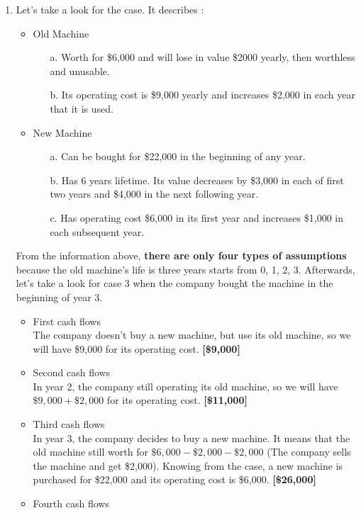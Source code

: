 \documentclass{article}
\begin{document}
\begin{enumerate}
		\pagebreak
		\item Let's take a look for the case. It describes :
		\begin{itemize}
			\item Old Machine
			\begin{itemize}
				\item[a.] Worth for \$6,000 and will lose in value \$2000 yearly, then worthless and unusable.
				\item[b.] Its operating cost is \$9,000 yearly and increases \$2,000 in each year that it is used.
			\end{itemize}
			\item New Machine
			\begin{itemize}
				\item[a.] Can be bought for \$22,000 in the beginning of any year.
				\item[b.] Has 6 years lifetime. Its value decreases by \$3,000 in each of first two years and \$4,000 in the next following year.
				\item[c.] Has operating cost \$6,000 in its first year and increases \$1,000 in each subsequent year.
			\end{itemize}
		\end{itemize}
		From the information above, \textbf{there are only four types of assumptions} because the old machine's life is three years starts from 0, 1, 2, 3. Afterwards, let's take a look for case 3 when the company bought the machine in the beginning of year 3.
		\begin{itemize}
			\item First cash flows\\
			The company doesn't buy a new machine, but use its old machine, so we will have \$9,000 for its operating cost. \textbf{[\$9,000]}
			\item Second cash flows\\
			In year 2, the company still operating its old machine, so we will have $\$9,000+\$2,000$ for its operating cost. \textbf{[\$11,000]}
			\item Third cash flows\\
			In year 3, the company decides to buy a new machine. It means that the old machine still worth for $\$6,000-\$2,000-\$2,000$ (The company sells the machine and get \$2,000). Knowing from the case, a new machine is purchased for \$22,000 and its operating cost is \$6,000. \textbf{[\$26,000]}
			\item Fourth cash flows\\

\end{itemize}
\end{enumerate}
\end{document}
